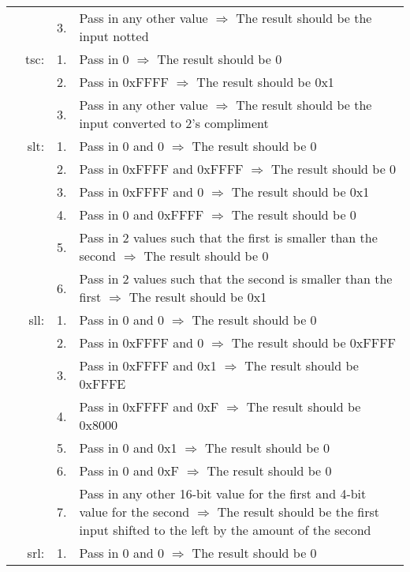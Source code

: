 \begin{longtable}{ r r r p{11cm} }
				                &      & 3. & Pass in any other value $\Rightarrow$ The result should be the input notted\\
				                & tsc: & 1. & Pass in 0 $\Rightarrow$ The result should be 0\\
				                &      & 2. & Pass in 0xFFFF $\Rightarrow$ The result should be 0x1\\
				                &      & 3. & Pass in any other value $\Rightarrow$ The result should be the input converted to 2's compliment\\
				                & slt: & 1. & Pass in 0 and 0 $\Rightarrow$ The result should be 0\\
				                &      & 2. & Pass in 0xFFFF and 0xFFFF $\Rightarrow$ The result should be 0\\
				                &      & 3. & Pass in 0xFFFF and 0 $\Rightarrow$ The result should be 0x1\\
				                &      & 4. & Pass in 0 and 0xFFFF $\Rightarrow$ The result should be 0\\
				                &      & 5. & Pass in 2 values such that the first is smaller than the second $\Rightarrow$ The result should be 0\\
				                &      & 6. & Pass in 2 values such that the second is smaller than the first $\Rightarrow$ The result should be 0x1\\
				                & sll: & 1. & Pass in 0 and 0 $\Rightarrow$ The result should be 0\\
				                &      & 2. & Pass in 0xFFFF and 0 $\Rightarrow$ The result should be 0xFFFF\\
				                &      & 3. & Pass in 0xFFFF and 0x1 $\Rightarrow$ The result should be 0xFFFE\\
				                &      & 4. & Pass in 0xFFFF and 0xF $\Rightarrow$ The result should be 0x8000\\
				                &      & 5. & Pass in 0 and 0x1 $\Rightarrow$ The result should be 0\\
				                &      & 6. & Pass in 0 and 0xF $\Rightarrow$ The result should be 0\\
				                &      & 7. & Pass in any other 16-bit value for the first and 4-bit value for the second $\Rightarrow$ The result should be the first input shifted to the left by the amount of the second\\
				                & srl: & 1. & Pass in 0 and 0 $\Rightarrow$ The result should be 0\\

\end{longtable}
